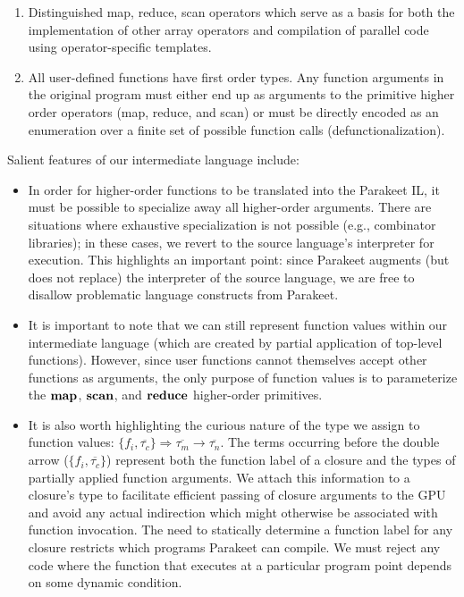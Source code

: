 \documentclass[preprint]{sigplanconf}
\begin{document}
\begin{enumerate}
\item Distinguished map, reduce, scan operators which serve as a basis for both the implementation of other array 
 operators and compilation of parallel code using operator-specific templates.  
\item All user-defined functions have first order types. Any function arguments in the original program 
 must either end up as arguments to the primitive higher order operators (map, reduce, and scan) or
 must be directly encoded as an enumeration over a finite set of possible function calls (defunctionalization). 
\end{enumerate}

Salient features of our intermediate language include:
\begin{itemize}
\item In order for higher-order functions to be translated into the Parakeet IL, it must be possible to specialize away all higher-order arguments. There are situations where exhaustive specialization is not possible (e.g., combinator libraries); in these cases, we revert to the source language's interpreter for
execution. This highlights an important point: since Parakeet augments (but does not replace) the interpreter of the source language, we are free to disallow problematic language constructs from Parakeet.

\item It is important to note that we can still represent function values within our intermediate language (which are created by partial application of top-level functions). However, since user functions cannot themselves accept other functions as arguments, the only purpose of function values is to parameterize the $\mbox{\textbf{map}}$, $\mbox{\textbf{scan}}$, and $\mbox{\textbf{reduce}}$ higher-order primitives.

\item It is also worth highlighting the curious nature of the type we assign to function values:
$ \{ f_i, \overline{\tau_{c}} \} \Rightarrow \overline{\tau_m} \rightarrow \overline{\tau_n}$.  The terms occurring before the double arrow ($\{f_i, \overline{\tau_{c}} \}$) represent both the function label of a closure and the types of partially applied function arguments. We attach this information to a closure's type to facilitate efficient passing of closure arguments to the GPU and avoid any actual indirection which might otherwise be associated with function invocation. The need to statically determine a function label for any closure restricts which programs Parakeet can compile. We must reject any code where the function
that executes at a particular program point depends on some dynamic condition.
\end{itemize}
\end{document}
